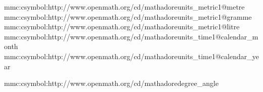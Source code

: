 \startsetups mmc:csymbol:http://www.openmath.org/cd/mathadore units_metric1@metre
\stopsetups
\startsetups mmc:csymbol:http://www.openmath.org/cd/mathadore units_metric1@gramme
\stopsetups
\startsetups mmc:csymbol:http://www.openmath.org/cd/mathadore units_metric1@litre
\stopsetups
\startsetups mmc:csymbol:http://www.openmath.org/cd/mathadore units_time1@calendar_month
\stopsetups
\startsetups mmc:csymbol:http://www.openmath.org/cd/mathadore units_time1@calendar_year
\stopsetups

\startsetups mmc:csymbol:http://www.openmath.org/cd/mathadore degree_angle
\stopsetups

\protect \endinput
